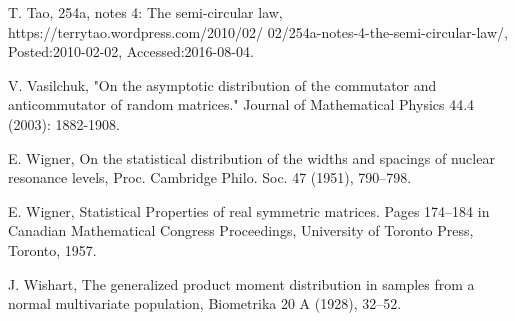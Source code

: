 \documentclass[11pt,reqno]{amsart}
\numberwithin{equation}{section}
\theoremstyle{plain}
\begin{document}
\begin{thebibliography}{BCDHMSTPY}
T. Tao, 254a, notes 4: The semi-circular law, https://terrytao.wordpress.com/2010/02/ 02/254a-notes-4-the-semi-circular-law/, Posted:2010-02-02, Accessed:2016-08-04.

V. Vasilchuk, "On the asymptotic distribution of the commutator and anticommutator of random matrices." Journal of Mathematical Physics 44.4 (2003): 1882-1908.


E. Wigner, On the statistical distribution of the widths and spacings of nuclear resonance levels, Proc. Cambridge Philo. Soc. 47 (1951), 790–798.

E. Wigner, Statistical Properties of real symmetric matrices. Pages 174–184 in Canadian Mathematical Congress Proceedings, University of Toronto Press, Toronto, 1957.

J. Wishart, The generalized product moment distribution in samples from a normal multivariate population, Biometrika 20 A (1928), 32–52.
\end{thebibliography}
\end{document}
